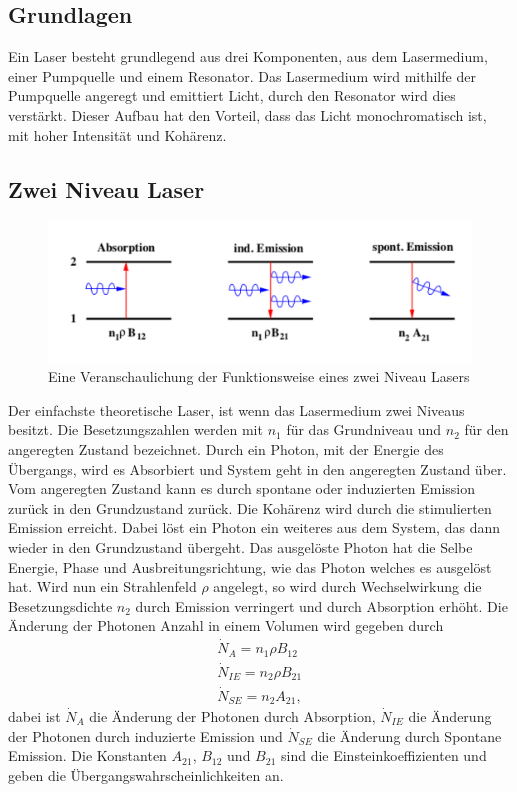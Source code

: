 
\subsection{Grundlagen}

Ein Laser besteht grundlegend aus drei Komponenten, aus dem Lasermedium, einer Pumpquelle und einem Resonator. Das Lasermedium wird mithilfe der Pumpquelle angeregt und emittiert Licht, durch den Resonator wird dies verstärkt. Dieser Aufbau hat den Vorteil, dass das Licht monochromatisch ist, mit hoher Intensität und Kohärenz.
\subsection{Zwei Niveau Laser}
\begin{figure}
\centering
\includegraphics[scale=0.75]{../Grafiken/Emission.pdf}
\caption{Eine Veranschaulichung der Funktionsweise eines zwei Niveau Lasers\cite{V61}\label{Emission}}
\end{figure}
Der einfachste theoretische Laser, ist wenn das Lasermedium  zwei Niveaus besitzt. Die Besetzungszahlen werden mit $n_1$ für das Grundniveau und $n_2$ für den angeregten Zustand bezeichnet. Durch ein Photon, mit der Energie des Übergangs, wird es Absorbiert und System geht in den angeregten Zustand über.\\
Vom angeregten Zustand kann es durch spontane oder induzierten Emission zurück in den Grundzustand zurück. Die Kohärenz wird durch die stimulierten Emission erreicht. Dabei löst ein Photon ein weiteres aus dem System, das dann wieder in den Grundzustand übergeht. Das ausgelöste Photon hat die Selbe Energie, Phase und Ausbreitungsrichtung, wie das Photon welches es ausgelöst hat. Wird nun ein Strahlenfeld $\rho$ angelegt, so wird durch Wechselwirkung die Besetzungsdichte $n_2$ durch Emission verringert und durch Absorption erhöht.
Die Änderung der Photonen Anzahl in einem Volumen wird gegeben durch
\begin{align*}
\dot{N}_A=n_1 \rho B_{12}\\
\dot{N}_{IE}=n_2\rho B_{21}\\
\dot{N}_{SE}=n_2A_{21},
\end{align*} dabei ist $\dot{N}_A$ die Änderung der Photonen durch Absorption, $\dot{N}_{IE}$ die Änderung der Photonen durch induzierte Emission und $\dot{N}_{SE}$ die Änderung durch Spontane Emission. Die Konstanten $A_{21}$, $B_{12}$ und $B_{21}$ sind die Einsteinkoeffizienten und geben die Übergangswahrscheinlichkeiten an.\\
